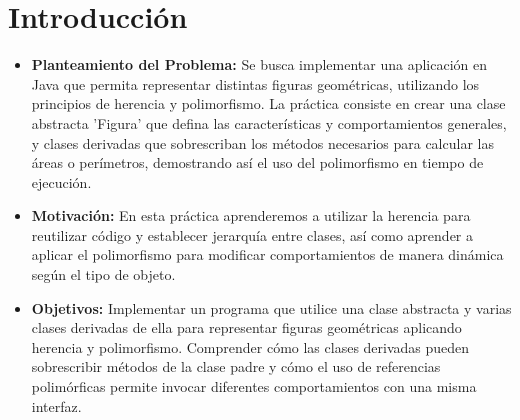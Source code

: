 \documentclass[letterpaper,12pt]{article}
\begin{document}
\tableofcontents
\clearpage

\section{Introducción}

\begin{itemize}
\item \textbf{Planteamiento del Problema:} Se busca implementar una aplicación en Java que permita representar distintas figuras geométricas, utilizando los principios de herencia y polimorfismo. La práctica consiste en crear una clase abstracta 'Figura' que defina las características y comportamientos generales, y clases derivadas que sobrescriban los métodos necesarios para calcular las áreas o perímetros, demostrando así el uso del polimorfismo en tiempo de ejecución.

\item \textbf{Motivación:} 
En esta práctica aprenderemos a utilizar la herencia para reutilizar código y establecer jerarquía entre clases, así como aprender a aplicar el polimorfismo para modificar comportamientos de manera dinámica según el tipo de objeto. 

\item \textbf{Objetivos:} 
Implementar un programa que utilice una clase abstracta y varias clases derivadas de ella para representar figuras geométricas aplicando herencia y polimorfismo. Comprender cómo las clases derivadas pueden sobrescribir métodos de la clase padre y cómo el uso de referencias polimórficas permite invocar diferentes comportamientos con una misma interfaz.


\end{itemize}
\end{document}
